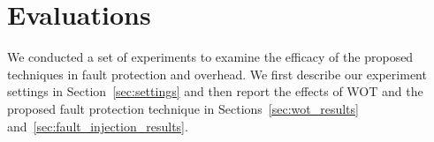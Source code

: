 \documentclass{article}
\newcommand{\TODO}[1]{{\it \color{blue}\{TODO: #1\}}}
\begin{document}


    

\section{Evaluations}
\label{sec:eval}

We conducted a set of experiments to examine the efficacy of the proposed techniques in fault protection and overhead. We first describe our experiment settings in Section~\ref{sec:settings} and then report the effects of WOT and the proposed fault protection technique in Sections~\ref{sec:wot_results} and~\ref{sec:fault_injection_results}.

\end{document}
